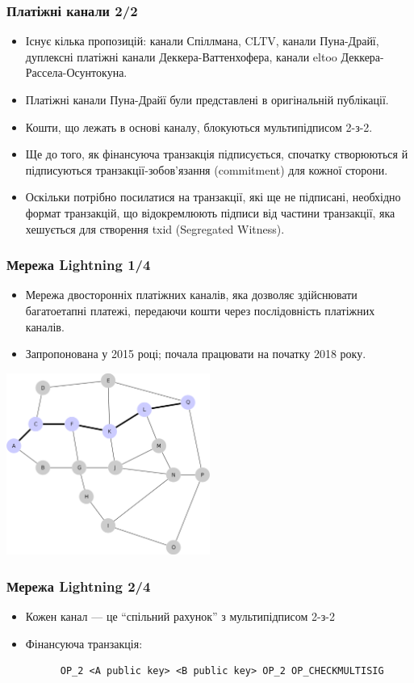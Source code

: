 \documentclass{beamer}
\begin{document}
\begin{frame}
  \frametitle{Платіжні канали 2/2}
  \begin{itemize}
  \item Існує кілька пропозицій: канали Спіллмана, CLTV, канали Пуна-Драйї,
    дуплексні платіжні канали Деккера-Ваттенхофера, канали eltoo Деккера-Рассела-Осунтокуна.
  \item Платіжні канали Пуна-Драйї були представлені в оригінальній публікації.
  \item Кошти, що лежать в основі каналу, блокуються мультипідписом 2-з-2.
  \item Ще до того, як фінансуюча транзакція підписується, спочатку створюються
    й підписуються транзакції-зобов’язання (commitment) для кожної сторони.
  \item Оскільки потрібно посилатися на транзакції, які ще не підписані,
    необхідно формат транзакцій, що відокремлюють підписи від частини
    транзакції, яка хешується для створення txid (Segregated Witness).
  \end{itemize}
\end{frame}

\begin{frame}[fragile]
  \frametitle{Мережа Lightning 1/4}
  \begin{itemize}
  \item Мережа двосторонніх платіжних каналів, яка дозволяє здійснювати
    багатоетапні платежі, передаючи кошти через послідовність платіжних каналів.
  \item Запропонована у 2015 році; почала працювати на початку 2018 року.
  \end{itemize}
  \begin{center}
    \includegraphics[width=0.5\textwidth]{ln}
  \end{center}
\end{frame}

\begin{frame}[fragile]
  \frametitle{Мережа Lightning 2/4}
  \begin{itemize}
  \item Кожен канал — це ``спільний рахунок'' з мультипідписом 2-з-2
  \item Фінансуюча транзакція:
    \begin{verbatim}
      OP_2 <A public key> <B public key> OP_2 OP_CHECKMULTISIG
    \end{verbatim}
  \end{itemize}
\end{frame}
\end{document}
